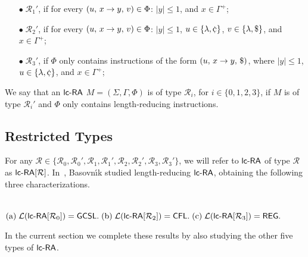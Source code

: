\begin{itemize}
\item[$\bullet\;\mathcal{R}_1'$,] if for every $(u,\,x\rightarrow y,\,v) \in \Phi$: $|y|\le 1$, and $x \in \Gamma^+$;
\item[$\bullet\;\mathcal{R}_2'$,] if for every $(u,\,x\rightarrow y,\,v) \in \Phi$: $|y|\le 1$, $u \in \{\lambda,\leftsentinel\}$, $v \in \{\lambda,\$\}$, and $x \in \Gamma^+$;
\item[$\bullet\;\mathcal{R}_3'$,]  if $\Phi$ only contains instructions of the form $(u,\,x\rightarrow y,\,\$)$, where $|y|\le 1$, $u \in \{\lambda,\leftsentinel\}$, and $x \in \Gamma^+$;
\end{itemize}

We say that an $\lcRA$ $M=(\Sigma,\Gamma,\Phi)$ is of type $\mathcal{R}_i$, for $i \in \{0, 1, 2, 3\}$, if $M$ is of type $\mathcal{R}_i'$ and $\Phi$ only contains length-reducing instructions.

\subsection{Restricted Types}

For any $\mathcal{R} \in \{\mathcal{R}_0,\mathcal{R}_0',\mathcal{R}_1,\mathcal{R}_1',\mathcal{R}_2,\mathcal{R}_2',\mathcal{R}_3,\mathcal{R}_3'\}$, we will refer to $\lcRA$ of type $\mathcal{R}$ as ${\lcRA}[\mathcal{R}]$. In~\cite{B10Diploma}, Basovn{\'\i}k  studied length-reducing $\lcRA$, obtaining the following three characterizations.

\begin{theorem}{\rm \cite{B10Diploma}}\label{ThmBasovnik} \\[+0.2cm]
${\rm (a)}\;  {\mathcal L}(\lcRA[0])   =  \GCSL.\;
{\rm (b)}\; {\mathcal L}(\lcRA[2])   =  \CFL.\;
{\rm (c)}\; {\mathcal L}(\lcRA[3])   =  \REG.$
\end{theorem}

In the current section we complete these results by also studying the other five types of $\lcRA$.
\vspace{+0.2cm}

